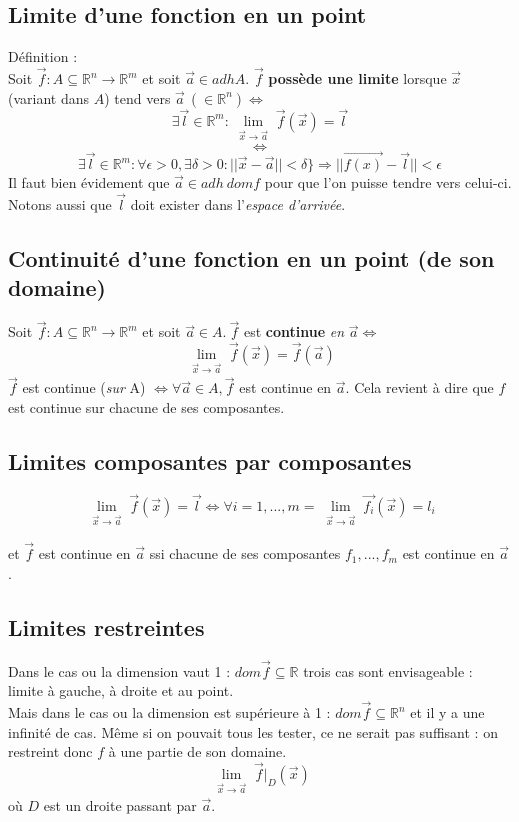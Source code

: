 \documentclass	[11pt, a4paper, openany]{book}
\begin{document}
\subsection{Limite d'une fonction en un point}
Définition :\\
Soit $\vec{f} : A \subseteq \mathbb{R}^n \rightarrow \mathbb{R}^m$ et soit $\vec{a} \in adh A$. $\vec{f}$ \textbf{possède une limite} lorsque $\vec{x}$ (variant dans $A$) tend vers $\vec{a}\ (\in \mathbb{R}^n) \Leftrightarrow$
$$\exists \vec{l} \in \mathbb{R}^m : \lim\limits_{\substack{\vec{x} \to \vec{a}}} \vec{f}(\vec{x}) = \vec{l}$$
$$\Leftrightarrow$$
$$\exists \vec{l} \in \mathbb{R}^m : \forall \epsilon > 0, \exists \delta > 0 : ||\vec{x} - \vec{a}|| < \delta \}\Rightarrow ||\vec{f(x)} - \vec{l}|| < \epsilon$$
Il faut bien évidement que $\vec{a} \in adh\ domf$ pour que l'on puisse tendre vers celui-ci. Notons aussi que $\vec{l}$ doit exister dans l'\textit{espace d'arrivée}.

\subsection{Continuité d'une fonction en un point (de son domaine)}
Soit $\vec{f} : A \subseteq \mathbb{R}^n \rightarrow \mathbb{R}^m$ et soit $\vec{a} \in A.\ \vec{f}$ est \textbf{continue} \emph{en} $\vec{a} \Leftrightarrow$
$$\lim\limits_{\substack{\vec{x} \to \vec{a}}} \vec{f}(\vec{x}) = \vec{f}(\vec{a})$$
$\vec{f}$ est continue (\emph{sur} A) $\Leftrightarrow \forall\vec{a} \in A, \vec{f}$ est continue en $\vec{a}$. Cela revient à dire que $f$ est continue sur chacune de ses composantes.

\subsection{Limites composantes par composantes}
$$\lim\limits_{\substack{\vec{x} \to \vec{a}}} \vec{f}(\vec{x}) = \vec{l} \Leftrightarrow \forall i = 1, ..., m = \lim\limits_{\substack{\vec{x} \to \vec{a}}} \vec{f_i}(\vec{x}) = l_i$$
\begin{center}
et $\vec{f}$ est continue en $\vec{a}$ ssi chacune de ses composantes $f_1, ..., f_m$ est continue en $\vec{a}$.
\end{center}
\subsection{Limites restreintes}
Dans le cas ou la dimension vaut 1 : $dom\vec{f} \subseteq \mathbb{R}$ trois cas sont envisageable : limite à gauche, à droite et au point.\\
Mais dans le cas ou la dimension est supérieure à 1 : $dom\vec{f} \subseteq \mathbb{R}^n$ et il y a une infinité de cas. Même si on pouvait tous les tester, ce ne serait pas suffisant : on restreint donc $f$ à une partie de son domaine.
$$\lim\limits_{\substack{\vec{x} \to \vec{a}}} \vec{f}|_D (\vec{x})$$
où $D$ est un droite passant par $\vec{a}$.\\
\end{document}

